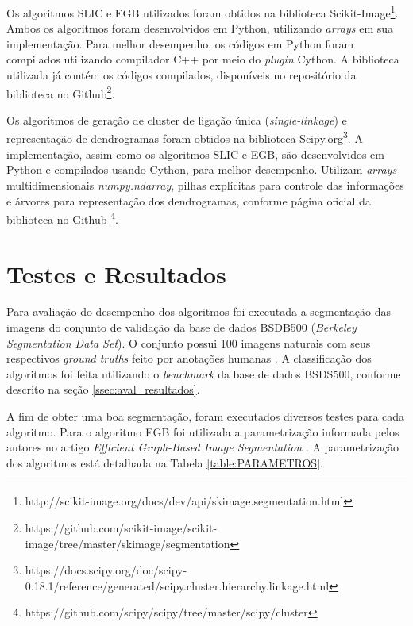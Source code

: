 \begin{document}
Os algoritmos SLIC e EGB utilizados foram obtidos na biblioteca Scikit-Image\footnote{http://scikit-image.org/docs/dev/api/skimage.segmentation.html}. Ambos os algoritmos foram desenvolvidos em Python, utilizando \textit{arrays} em sua implementação. Para melhor desempenho, os códigos em Python foram compilados utilizando compilador C++ por meio do \textit{plugin} Cython. A biblioteca utilizada já contém os códigos compilados, disponíveis no repositório da biblioteca no Github\footnote{https://github.com/scikit-image/scikit-image/tree/master/skimage/segmentation}.

Os algoritmos de geração de cluster de ligação única (\textit{single-linkage}) e representação de dendrogramas foram obtidos na biblioteca Scipy.org\footnote{https://docs.scipy.org/doc/scipy-0.18.1/reference/generated/scipy.cluster.hierarchy.linkage.html}. A implementação, assim como os algoritmos SLIC e EGB, são desenvolvidos em Python e compilados usando Cython, para melhor desempenho. Utilizam \textit{arrays} multidimensionais \textit{numpy.ndarray}, pilhas explícitas para controle das informações e árvores para representação dos dendrogramas, conforme página oficial da biblioteca no Github \footnote{https://github.com/scipy/scipy/tree/master/scipy/cluster}.


\section{Testes e Resultados} \label{sec:testes}

Para avaliação do desempenho dos algoritmos foi executada a segmentação das imagens do conjunto de validação da base de dados BSDB500 (\textit{Berkeley Segmentation Data Set}). O conjunto possui 100 imagens naturais com seus respectivos \textit{ground truths} feito por anotações humanas \cite{BSDS500}. A classificação dos algoritmos foi feita utilizando o \textit{benchmark} da base de dados BSDS500, conforme descrito na seção \ref{ssec:aval_resultados}.

A  fim de obter uma boa segmentação, foram executados diversos testes para cada algoritmo. Para o algoritmo EGB foi utilizada a parametrização informada pelos autores no artigo \textit{Efficient Graph-Based Image Segmentation} \cite{FELZENSZWALB}. A parametrização dos algoritmos está detalhada na Tabela \ref{table:PARAMETROS}.
\end{document}
